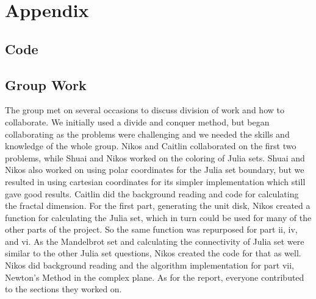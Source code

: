 \documentclass[letterpaper,11pt]{article}
\begin{document}
\newpage

\section{Appendix}

\subsection{Code}


\subsection{Group Work}
The group met on several occasions to discuss division of work and how to collaborate. We initially used a divide and conquer method, but began collaborating as the problems were challenging and we needed the skills and knowledge of the whole group. Nikos and Caitlin collaborated on the first two problems, while Shuai and Nikos worked on the coloring of Julia sets. Shuai and Nikos also worked on using polar coordinates for the Julia set boundary, but we resulted in using cartesian coordinates for its simpler implementation which still gave good results. Caitlin did the background reading and code for calculating the fractal dimension. For the first part, generating the unit disk, Nikos created a function for calculating the Julia set, which in turn could be used for many of the other parts of the project. So the same function was repurposed for part ii, iv, and vi. As the Mandelbrot set and calculating the connectivity of Julia set were similar to the other Julia set questions, Nikos created the code for that as well. Nikos did background reading and the algorithm implementation for part vii, Newton's Method in the complex plane. As for the report, everyone contributed to the sections they worked on. 
\end{document}
